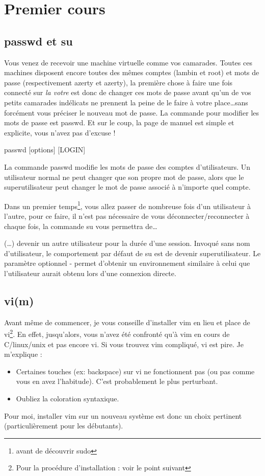 \documentclass[a4paper,11pt]{article}
\newcommand{\man}[2]{
    \begin{tcolorbox}[toprule=3mm,width=\textwidth,outer arc=0mm,colbacktitle=grayman,coltitle=black,colback={grayman},colframe={grayman},title={man : \tt #1}]
        \tt\raggedright #2
    \end{tcolorbox}
}
\newcommand{\mandesc}[1]{
    \begin{adjustwidth}{0.8cm}{}
        #1
    \end{adjustwidth}
}
\begin{document}
\section{Premier cours}
\subsection{passwd et su}
\par Vous venez de recevoir une machine virtuelle comme vos camarades. Toutes ces machines disposent encore toutes des mêmes comptes (lambin et root) et mots de passe (respectivement azerty et azerty), la première chose à faire une fois connecté sur \emph{la votre} est donc de changer ces mots de passe avant qu'un de vos petits camarades indélicats ne prennent la peine de le faire à votre place\ldots sans forcément vous préciser le nouveau mot de passe. La commande pour modifier les mots de passe est passwd. Et sur le coup, la page de manuel est simple et explicite, vous n'avez pas d'excuse !
\man{passwd}{
passwd [options] [LOGIN]
\mandesc{La commande passwd modifie les mots de passe des comptes d'utilisateurs. Un utilisateur normal ne peut changer que son propre mot de passe, alors que le superutilisateur peut changer le mot de passe associé à n'importe quel compte.}
}
\par Dans un premier temps\footnote{avant de découvrir sudo}, vous allez passer de nombreuse fois d'un utilisateur à l'autre, pour ce faire, il n'est pas nécessaire de vous déconnecter/reconnecter à chaque fois, la commande su vous permettra de\ldots
\man{su}{
(\dots) devenir un autre utilisateur pour la durée d'une session. Invoqué sans nom d'utilisateur, le comportement par défaut de su est de devenir superutilisateur. Le paramètre optionnel - permet d'obtenir un environnement similaire à celui que l'utilisateur aurait obtenu lors d'une connexion directe.}

\subsection{vi(m)}
\par Avant même de commencer, je vous conseille d'installer vim en lieu et place de vi\footnote{Pour la procédure d'installation : voir le point suivant}. En effet, jusqu'alors, vous n'avez été confronté qu'à vim en cours de C/linux/unix et pas encore vi. Si vous trouvez vim compliqué, vi est pire. Je m'explique :
\begin{itemize}
    \item Certaines touches (ex: backspace) sur vi ne fonctionnent pas (ou pas comme vous en avez l'habitude). C'est probablement le plus perturbant.
    \item Oubliez la coloration syntaxique.
\end{itemize}
\par Pour moi, installer vim sur un nouveau système est donc un choix pertinent (particulièrement pour les débutants).
\end{document}
